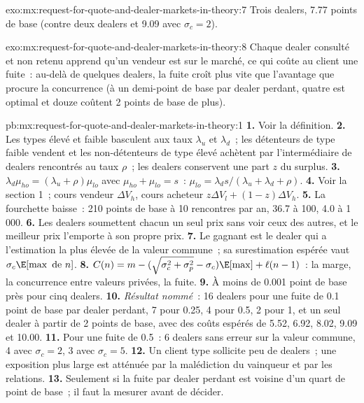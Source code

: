 \begin{solution}{exo:mx:request-for-quote-and-dealer-markets-in-theory:7}
Trois dealers, 7.77 points de base (contre deux dealers et 9.09 avec $\sigma_c=2$).
\end{solution}

\begin{solution}{exo:mx:request-for-quote-and-dealer-markets-in-theory:8}
Chaque dealer consulté et non retenu apprend qu'un vendeur est sur le marché, ce qui coûte au client une fuite~: au-delà de quelques dealers, la fuite croît plus vite que
l'avantage que procure la concurrence (à un demi-point de base par dealer perdant, quatre est optimal et douze coûtent 2 points de base de plus).
\end{solution}

\begin{solution}{pb:mx:request-for-quote-and-dealer-markets-in-theory:1}
\textbf{1.} Voir la définition.
\textbf{2.} Les types élevé et faible basculent aux taux $\lambda_u$ et $\lambda_d$~; les détenteurs de type faible vendent et les non-détenteurs de type élevé achètent par l'intermédiaire de dealers rencontrés au taux $\rho$~;
les dealers conservent une part $z$ du surplus.
\textbf{3.} $\lambda_d\mu_{ho}=(\lambda_u+\rho)\mu_{lo}$ avec $\mu_{ho}+\mu_{lo}=s$~: $\mu_{lo}=\lambda_ds/(\lambda_u+\lambda_d+\rho)$.
\textbf{4.} Voir la section 1~; cours vendeur $\Delta V_h$, cours acheteur $z\Delta V_l+(1-z)\Delta V_h$.
\textbf{5.} La fourchette baisse~: 210 points de base à 10 rencontres par an, 36.7 à 100, 4.0 à 1\,000.
\textbf{6.} Les dealers soumettent chacun un seul prix sans voir ceux des autres, et le meilleur prix l'emporte à son propre prix.
\textbf{7.} Le gagnant est le dealer qui a l'estimation la plus élevée de la valeur commune~; sa surestimation espérée vaut $\sigma_c\E[\max\text{ de }n]$.
\textbf{8.} $C(n)=m-(\sqrt{\sigma_c^2+\sigma_p^2}-\sigma_c)\E[\max]+\ell(n-1)$~: la marge, la concurrence entre valeurs privées, la fuite.
\textbf{9.} À moins de 0.001 point de base près pour cinq dealers.
\textbf{10.} \emph{Résultat nommé}~: 16 dealers pour une fuite de 0.1 point de base par dealer perdant, 7 pour 0.25, 4 pour 0.5, 2 pour 1, et un seul dealer à partir de 2
points de base, avec des coûts espérés de 5.52, 6.92, 8.02, 9.09 et 10.00.
\textbf{11.} Pour une fuite de 0.5~: 6 dealers sans erreur sur la valeur commune, 4 avec $\sigma_c=2$, 3 avec $\sigma_c=5$.
\textbf{12.} Un client type sollicite peu de dealers~; une exposition plus large est atténuée par la malédiction du vainqueur et par les relations.
\textbf{13.} Seulement si la fuite par dealer perdant est voisine d'un quart de point de base~; il faut la mesurer avant de décider.

\end{solution}
